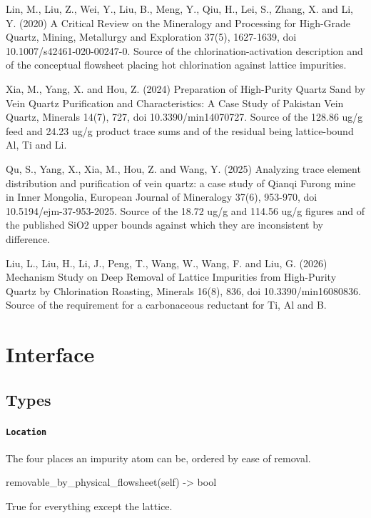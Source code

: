 \documentclass[10pt,a4paper,twoside]{report}
\begin{document}
Lin, M., Liu, Z., Wei, Y., Liu, B., Meng, Y., Qiu, H., Lei, S., Zhang, X. and Li, Y. (2020) A Critical Review on the Mineralogy and Processing for High-Grade Quartz, Mining, Metallurgy and Exploration 37(5), 1627-1639, doi 10.1007/s42461-020-00247-0. Source of the chlorination-activation description and of the conceptual flowsheet placing hot chlorination against lattice impurities.

Xia, M., Yang, X. and Hou, Z. (2024) Preparation of High-Purity Quartz Sand by Vein Quartz Purification and Characteristics: A Case Study of Pakistan Vein Quartz, Minerals 14(7), 727, doi 10.3390/min14070727. Source of the 128.86 ug/g feed and 24.23 ug/g product trace sums and of the residual being lattice-bound Al, Ti and Li.

Qu, S., Yang, X., Xia, M., Hou, Z. and Wang, Y. (2025) Analyzing trace element distribution and purification of vein quartz: a case study of Qianqi Furong mine in Inner Mongolia, European Journal of Mineralogy 37(6), 953-970, doi 10.5194/ejm-37-953-2025. Source of the 18.72 ug/g and 114.56 ug/g figures and of the published SiO2 upper bounds against which they are inconsistent by difference.

Liu, L., Liu, H., Li, J., Peng, T., Wang, W., Wang, F. and Liu, G. (2026) Mechanism Study on Deep Removal of Lattice Impurities from High-Purity Quartz by Chlorination Roasting, Minerals 16(8), 836, doi 10.3390/min16080836. Source of the requirement for a carbonaceous reductant for Ti, Al and B.

\section{Interface}

\subsection*{Types}

\paragraph{\texttt{Location}}

The four places an impurity atom can be, ordered by ease of removal.

\begin{verbatimsmall}
removable_by_physical_flowsheet(self) -> bool
\end{verbatimsmall}

True for everything except the lattice.
\end{document}
